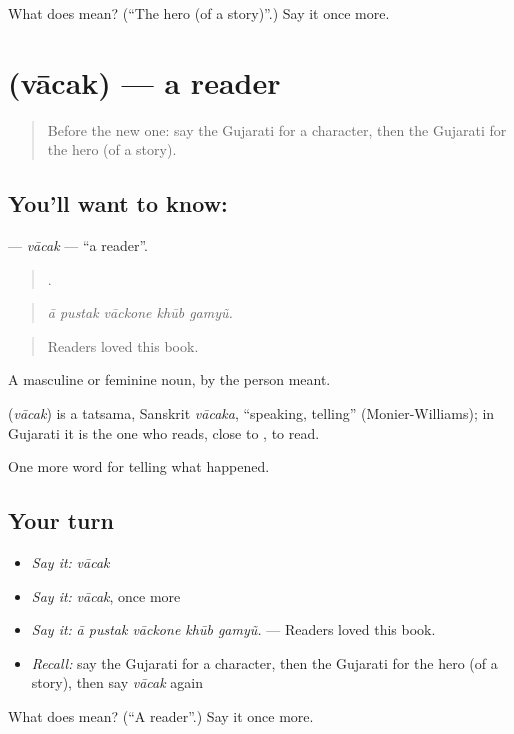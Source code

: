 \begin{tcolorbox}[breakable,colback=teal!4,colframe=teal!35!black,title={Before you move on}]
What does  mean? (\textquotedblleft{}The hero (of a story)\textquotedblright{}.) Say it once more.
\end{tcolorbox}
\section[\texorpdfstring{\gu{વાચક} (vācak)}{વાચક (vācak)}]{ (vācak) — a reader}

\label{lesson:GU-C337-vacak}



\begin{quote}
Before the new one: say the Gujarati for a character, then the Gujarati for the hero (of a story).
\end{quote}

\subsection*{You'll want to know: }
\textbf{} — \emph{vācak} — \textquotedblleft{}a reader\textquotedblright{}.

\begin{quote}
    .
\end{quote}

\begin{quote}
\emph{ā pustak vāckone khūb gamyũ.}
\end{quote}

\begin{quote}
Readers loved this book.
\end{quote}

A masculine or feminine noun, by the person meant.

\begin{cousinweb}
\textbf{} (\emph{vācak}) is a tatsama, Sanskrit \emph{vācaka}, \textquotedblleft{}speaking, telling\textquotedblright{} (Monier-Williams); in Gujarati it is the one who reads, close to \textbf{}, to read.
\end{cousinweb}

\begin{grammarlens}[title={What you've built}]
One more word for telling what happened.
\end{grammarlens}

\subsection*{Your turn}
\begin{itemize}
\raggedright
  \item \emph{Say it:} \emph{vācak}
  \item \emph{Say it:} \emph{vācak}, once more
  \item \emph{Say it:} \emph{ā pustak vāckone khūb gamyũ.} — Readers loved this book.
  \item \emph{Recall:} say the Gujarati for a character, then the Gujarati for the hero (of a story), then say \emph{vācak} again
\end{itemize}

\begin{tcolorbox}[breakable,colback=teal!4,colframe=teal!35!black,title={Before you move on}]
What does  mean? (\textquotedblleft{}A reader\textquotedblright{}.) Say it once more.
\end{tcolorbox}
